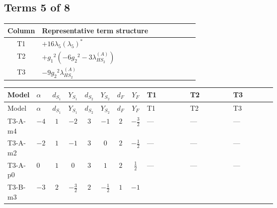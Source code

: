 \documentclass[8pt]{article}
\begin{document}
\begin{landscape}
\subsection*{Terms 5 of 8}
\begin{center}
\begin{tabular}{@{}c >{\raggedright\arraybackslash}p{0.82\linewidth}@{}}
\toprule
Column & Representative term structure \\
\midrule
T1 & \(\displaystyle +16 {\lambda_5} \left({\lambda_5}\right)^{*}\) \\
\midrule
T2 & \(\displaystyle +{g_1}^2 \left(-6 {g_2}^2-3 {\lambda_{HS_2}^{(A)}}\right)\) \\
\midrule
T3 & \(\displaystyle -9 {g_2}^2 {\lambda_{HS_2}^{(A)}}\) \\
\midrule
\bottomrule
\end{tabular}
\end{center}
\smallskip
\tiny
\begin{longtable}{@{}llcccccc >{\raggedright\arraybackslash}p{0.21\linewidth} >{\raggedright\arraybackslash}p{0.21\linewidth} >{\raggedright\arraybackslash}p{0.21\linewidth}@{}}
\toprule
Model & $\alpha$ & $d_{S_1}$ & $Y_{S_1}$ & $d_{S_2}$ & $Y_{S_2}$ & $d_F$ & $Y_F$ & T1 & T2 & T3 \\
\midrule
\endfirsthead
\toprule
Model & $\alpha$ & $d_{S_1}$ & $Y_{S_1}$ & $d_{S_2}$ & $Y_{S_2}$ & $d_F$ & $Y_F$ & T1 & T2 & T3 \\
\midrule
\endhead
T3-A-m4 & $-4$ & $1$ & $-2$ & $3$ & $-1$ & $2$ & $-\frac{3}{2}$ & --- & --- & --- \\
\midrule
T3-A-m2 & $-2$ & $1$ & $-1$ & $3$ & $0$ & $2$ & $-\frac{1}{2}$ & --- & --- & --- \\
\midrule
T3-A-p0 & $0$ & $1$ & $0$ & $3$ & $1$ & $2$ & $\frac{1}{2}$ & --- & --- & --- \\
\midrule
T3-B-m3 & $-3$ & $2$ & $-\frac{3}{2}$ & $2$ & $-\frac{1}{2}$ & $1$ & $-1$ & \scriptsize\adjustbox{max width=\linewidth}{$\begin{gathered} +16 {\lambda_5} \left({\lambda_5}\right)^{*}\end{gathered}$} & \scriptsize\adjustbox{max width=\linewidth}{$\begin{gathered} +{g_1}^2 \left(-6 {g_2}^2-3 {\lambda_{HS_2}^{(A)}}\right)\end{gathered}$} & \scriptsize\adjustbox{max width=\linewidth}{$\begin{gathered} -9 {g_2}^2 {\lambda_{HS_2}^{(A)}}\end{gathered}$} \\

\end{longtable}
\end{landscape}
\end{document}
